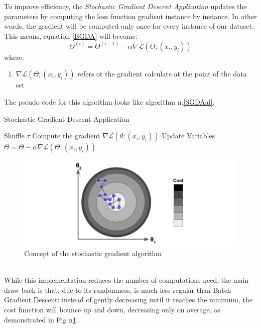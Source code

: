 \documentclass[conference]{IEEEtran}
\begin{document}
To improve efficiency, the \textit{Stochastic Gradient Descent Application} updates the parameters by computing the loss function gradient instance by instance. In other words, the gradient will be computed only once for every instance of our dataset. This means, equation \eqref{BGDA} will become:
\begin{equation}
    \Theta^{(i)} = \Theta^{(i-1)} - \alpha\nabla\mathscr{L}(\Theta;(x_i,y_i))\label{eq:SGDA}
\end{equation}
where:
%
\begin{enumerate}
  \item $\nabla\mathscr{L}(\Theta;(x_i,y_i))$ refers ot the gradient calculate at the point of the data set
\end{enumerate}
The pseudo code for this algorithm looks like algorithm n.\ref{SGDAal}. \\
\begin{algorithm}
\caption{Stochastic Gradient Descent Application}\label{SGDAal}
\begin{algorithmic}[1]
\State Shuffle $\tau$
\State Compute the gradient $\nabla\mathscr{L}(\theta;(x_i,y_i))$
\State Update Variables $\Theta = \Theta -\alpha\nabla\mathscr{L}(\Theta;(x_i,y_i))$
\EndFor
\EndFor
{}
\end{algorithmic}
\end{algorithm}
\begin{figure}[htbp]
    \includegraphics[scale=0.5]{Fig4.png}
    \caption{Concept of the stochastic gradient algorithm}
    \label{fig:st_grad}
\end{figure}
\\
While this implementation reduces the number of computations need, the main draw back is that, due to its randomness, is much less regular than Batch Gradient Descent: instead of gently decreasing until it reaches the minimum, the cost function will bounce up and down, decreasing only on average, as demonstrated in Fig n\ref{fig:st_grad}.
\end{document}
